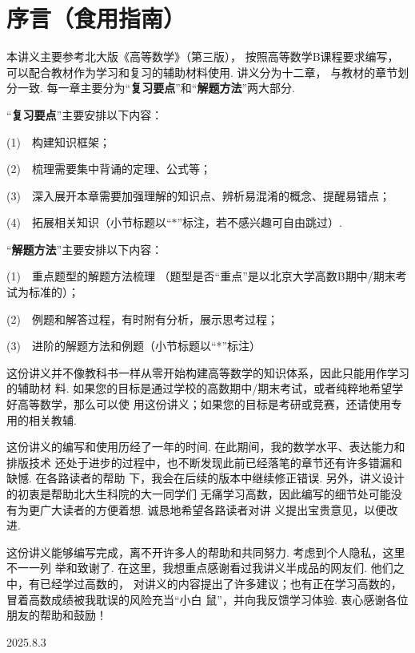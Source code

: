 \section*{序言（食用指南）}


本讲义主要参考北大版《高等数学》（第三版），
按照高等数学B课程要求编写，
可以配合教材作为学习和复习的辅助材料使用.
讲义分为十二章，
与教材的章节划分一致.
每一章主要分为“\textbf{复习要点}”和“\textbf{解题方法}”两大部分.
\vspace{1em}

“\textbf{复习要点}”主要安排以下内容：

(1)~~构建知识框架；

(2)~~梳理需要集中背诵的定理、公式等；

(3)~~深入展开本章需要加强理解的知识点、辨析易混淆的概念、提醒易错点；

(4)~~拓展相关知识（小节标题以“$*$”标注，若不感兴趣可自由跳过）.\vspace{1em}

“\textbf{解题方法}”主要安排以下内容：

(1)~~重点题型的解题方法梳理
（题型是否“重点”是以北京大学高数B期中/期末考试为标准的）；

(2)~~例题和解答过程，有时附有分析，展示思考过程；

(3)~~进阶的解题方法和例题（小节标题以“*”标注）\vspace{1em}

这份讲义并不像教科书一样从零开始构建高等数学的知识体系，因此只能用作学习的辅助材
料. 如果您的目标是通过学校的高数期中/期末考试，或者纯粹地希望学好高等数学，那么可以使
用这份讲义；如果您的目标是考研或竞赛，还请使用专用的相关教辅.

这份讲义的编写和使用历经了一年的时间. 在此期间，我的数学水平、表达能力和排版技术
还处于进步的过程中，也不断发现此前已经落笔的章节还有许多错漏和缺憾. 在各路读者的帮助
下，我会在后续的版本中继续修正错误. 另外，讲义设计的初衷是帮助北大生科院的大一同学们
无痛学习高数，因此编写的细节处可能没有为更广大读者的方便着想. 诚恳地希望各路读者对讲
义提出宝贵意见，以便改进.

这份讲义能够编写完成，离不开许多人的帮助和共同努力. 考虑到个人隐私，这里不一一列
举和致谢了. 在这里，我想重点感谢看过我讲义半成品的网友们. 他们之中，有已经学过高数的，
对讲义的内容提出了许多建议；也有正在学习高数的，冒着高数成绩被我耽误的风险充当“小白
鼠”，并向我反馈学习体验. 衷心感谢各位朋友的帮助和鼓励！


\begin{flushright}
    2025.8.3
\end{flushright}